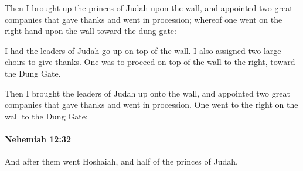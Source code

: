 			\begin{versebox}
					\item[BHS] 
					\item[LXX] 
					\item[ASV] Then I brought up the princes of Judah upon the wall, and appointed two great companies that gave thanks and went in procession; whereof one went on the right hand upon the wall toward the dung gate:
					\item[NIV] I had the leaders of Judah go up on top of the wall. I also assigned two large choirs to give thanks. One was to proceed on top of the wall to the right, toward the Dung Gate.
					\item[NRSV] Then I brought the leaders of Judah up onto the wall, and appointed two great companies that gave thanks and went in procession. One went to the right on the wall to the Dung Gate;
			\end{versebox}

		\paragraph{Nehemiah 12:32} %
			\label{NEHEMIAH-12-32}

			And after them went Hoshaiah, and half of the princes of Judah,

